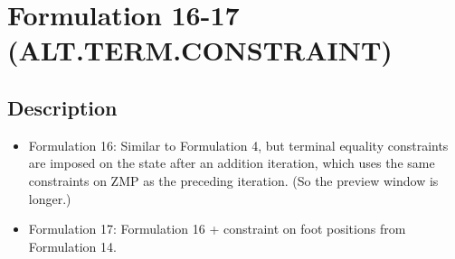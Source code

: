 \section{Formulation 16-17 (ALT.TERM.CONSTRAINT)}


\subsection{Description}
\begin{itemize}
    \item Formulation 16: Similar to Formulation 4, but terminal equality constraints are 
        imposed on the state after an addition iteration, which uses the same constraints 
        on ZMP as the preceding iteration. (So the preview window is longer.)
    \item Formulation 17: Formulation 16 + constraint on foot positions from Formulation 14.
\end{itemize}
